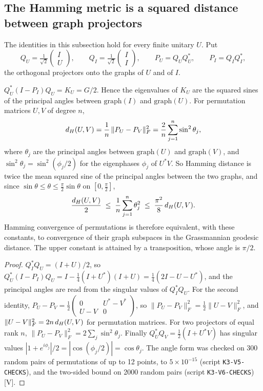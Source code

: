 \documentclass[11pt]{article}
\theoremstyle{remark}\newtheorem{remark}[theorem]{Remark}
\begin{document}
\subsection{The Hamming metric is a squared distance between graph projectors}
The identities in this subsection hold for every finite unitary $U$. Put
\[
Q_U=\tfrac1{\sqrt2}\begin{pmatrix}I\\U\end{pmatrix},\qquad Q_I=\tfrac1{\sqrt2}\begin{pmatrix}I\\I\end{pmatrix},\qquad P_U=Q_UQ_U^*,\qquad P_I=Q_IQ_I^*,
\]
the orthogonal projectors onto the graphs of $U$ and of $I$.
\begin{proposition}[T+V]\label{prop:graph}
$Q_U^*(I-P_I)Q_U=K_U=G/2$. Hence the eigenvalues of $K_U$ are the squared sines of the principal angles between $\mathrm{graph}(I)$ and $\mathrm{graph}(U)$. For permutation matrices $U,V$ of degree $n$,
\[
d_H(U,V)=\frac1n\,\|P_U-P_V\|_F^2=\frac2n\sum_{j=1}^n\sin^2\theta_j,
\]
where $\theta_j$ are the principal angles between $\mathrm{graph}(U)$ and $\mathrm{graph}(V)$, and $\sin^2\theta_j=\sin^2(\phi_j/2)$ for the eigenphases $\phi_j$ of $U^*V$. So Hamming distance is twice the mean squared sine of the principal angles between the two graphs, and since $\sin\theta\le\theta\le\tfrac\pi2\sin\theta$ on $[0,\tfrac\pi2]$,
\[
\frac{d_H(U,V)}2\;\le\;\frac1n\sum_{j=1}^n\theta_j^2\;\le\;\frac{\pi^2}{8}\,d_H(U,V).
\]
Hamming convergence of permutations is therefore equivalent, with these constants, to convergence of their graph subspaces in the Grassmannian geodesic distance. The upper constant is attained by a transposition, whose angle is $\pi/2$.
\end{proposition}
\begin{proof}
$Q_I^*Q_U=(I+U)/2$, so $Q_U^*(I-P_I)Q_U=I-\tfrac14(I+U^*)(I+U)=\tfrac14(2I-U-U^*)$, and the principal angles are read from the singular values of $Q_I^*Q_U$. For the second identity, $P_U-P_V=\tfrac12\begin{pmatrix}0&U^*-V^*\\U-V&0\end{pmatrix}$, so $\|P_U-P_V\|_F^2=\tfrac12\|U-V\|_F^2$, and $\|U-V\|_F^2=2n\,d_H(U,V)$ for permutation matrices. For two projectors of equal rank $n$, $\|P_U-P_V\|_F^2=2\sum_j\sin^2\theta_j$. Finally $Q_U^*Q_V=\tfrac12(I+U^*V)$ has singular values $|1+e^{i\phi_j}|/2=|\cos(\phi_j/2)|=\cos\theta_j$. The angle form was checked on 300 random pairs of permutations of up to 12 points, to $5\times10^{-15}$ (script \texttt{K3-V5-CHECKS}), and the two-sided bound on 2000 random pairs (script \texttt{K3-V6-CHECKS}) [V].
\end{proof}
\end{document}
